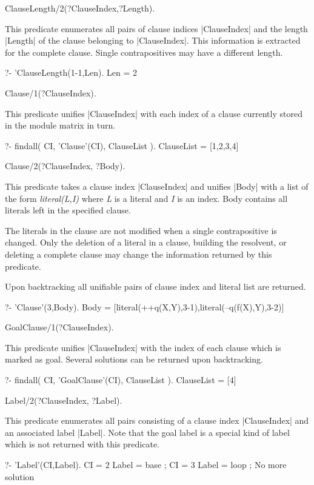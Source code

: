 \Predicate ClauseLength/2(?ClauseIndex,?Length).

This predicate enumerates all pairs of clause indices |ClauseIndex| and the
length |Length| of the clause belonging to |ClauseIndex|. This information is
extracted for the complete clause. Single contrapositives may have a different
length.

\begin{BoxedSample}
  ?- 'ClauseLength(1-1,Len).
  Len = 2
\end{BoxedSample}


\Predicate Clause/1(?ClauseIndex).

This predicate unifies |ClauseIndex| with each index of a clause currently
stored in the module matrix in turn.
\begin{BoxedSample}
  ?- findall( CI, 'Clause'(CI), ClauseList ).
  ClauseList = [1,2,3,4]
\end{BoxedSample}

\Predicate Clause/2(?ClauseIndex, ?Body).

This predicate takes a clause index |ClauseIndex| and unifies |Body| with a
list of the form {\em literal(L,I)}\/ where {\em L}\/ is a literal and {\em
  I}\/ is an index. Body contains all literals left in the specified clause.

The literals in the clause are not modified when a single contrapositive is
changed. Only the deletion of a literal in a clause, building the resolvent,
or deleting a complete clause may change the information returned by this
predicate.

Upon backtracking all unifiable pairs of clause index and literal list are
returned.
\begin{BoxedSample}
  ?- 'Clause'(3,Body).
  Body = [literal(++q(X,Y),3-1),literal(--q(f(X),Y),3-2)]
\end{BoxedSample}

\Predicate GoalClause/1(?ClauseIndex).

This predicate unifies |ClauseIndex| with the index of each clause which is
marked as goal. Several solutions can be returned upon backtracking.
\begin{BoxedSample}
  ?- findall( CI, 'GoalClause'(CI), ClauseList ).
  ClauseList = [4]
\end{BoxedSample}

\Predicate Label/2(?ClauseIndex, ?Label).

This predicate enumerates all pairs consisting of a clause index |ClauseIndex|
and an associated label |Label|. Note that the goal label is a special kind of
label which is not returned with this predicate.
\begin{BoxedSample}
  ?- 'Label'(CI,Label).
  CI = 2
  Label = base
  ;
  CI = 3
  Label = loop
  ;
  No more solution
\end{BoxedSample}

